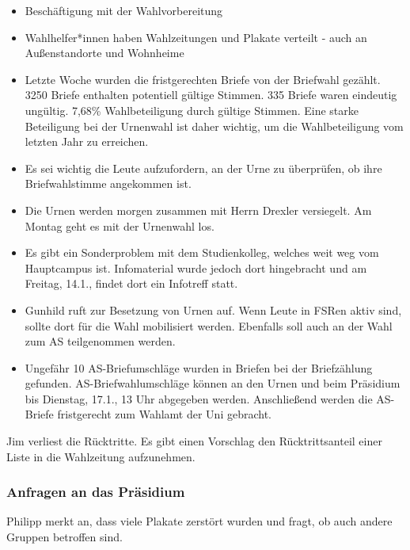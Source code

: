 \documentclass[ngerman,headheight=70pt]{scrartcl}
\begin{document}
    \begin{itemize}
        \item Beschäftigung mit der Wahlvorbereitung
        \item Wahlhelfer*innen haben Wahlzeitungen und Plakate verteilt - auch
              an Außenstandorte und Wohnheime
        \item Letzte Woche wurden die fristgerechten Briefe von der Briefwahl
              gezählt. 3250 Briefe enthalten potentiell gültige Stimmen. 335 Briefe
              waren eindeutig ungültig. 7,68\% Wahlbeteiligung durch gültige
              Stimmen. Eine starke Beteiligung bei der Urnenwahl ist daher
              wichtig, um die Wahlbeteiligung vom letzten Jahr zu erreichen.
        \item Es sei wichtig die Leute aufzufordern, an der Urne zu überprüfen, ob
              ihre Briefwahlstimme angekommen ist.
        \item Die Urnen werden morgen zusammen mit Herrn Drexler versiegelt. Am
              Montag geht es mit der Urnenwahl los.
        \item Es gibt ein Sonderproblem mit dem Studienkolleg, welches weit weg
              vom Hauptcampus ist. Infomaterial wurde jedoch dort hingebracht
              und am Freitag, 14.1., findet dort ein Infotreff statt.
        \item Gunhild ruft zur Besetzung von Urnen auf. Wenn Leute in FSRen aktiv
              sind, sollte dort für die Wahl mobilisiert werden. Ebenfalls soll
              auch an der Wahl zum AS teilgenommen werden.
        \item Ungefähr 10 AS-Briefumschläge wurden in Briefen bei der Briefzählung
              gefunden. AS-Briefwahlumschläge können an den Urnen und beim Präsidium
              bis Dienstag, 17.1., 13 Uhr abgegeben werden. Anschließend werden
              die AS-Briefe fristgerecht zum Wahlamt der Uni gebracht.
    \end{itemize}

    Jim verliest die Rücktritte. Es gibt einen Vorschlag den Rücktrittsanteil einer
    Liste in die Wahlzeitung aufzunehmen.

    \subsubsection{Anfragen an das Präsidium}

    Philipp merkt an, dass viele Plakate zerstört wurden und fragt, ob auch andere
    Gruppen betroffen sind.
\end{document}
